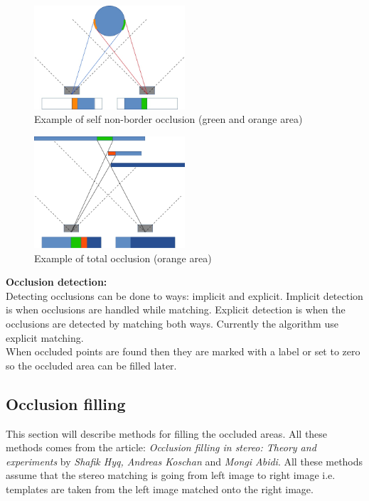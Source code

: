 \begin{figure}
  \centering
  \includegraphics[width=0.5\textwidth]{images/selfOcc}
  \caption{Example of self non-border occlusion (green and orange area)}
  \label{fig:selfOcc}
\end{figure}

\begin{figure}
  \centering
  \includegraphics[width=0.5\textwidth]{images/compOcc}
  \caption{Example of total occlusion (orange area)}
  \label{fig:totalOcc}
\end{figure}

\textbf{Occlusion detection:}\\
Detecting occlusions can be done to ways: implicit and explicit. Implicit detection is when occlusions are handled while matching. Explicit detection is when the occlusions are detected by matching both ways. Currently the algorithm use explicit matching.\\
When occluded points are found then they are marked with a label or set to zero so the occluded area can be filled later.

\subsection{Occlusion filling}
This section will describe methods for filling the occluded areas. All these methods comes from the article: \textit{Occlusion filling in stereo: Theory and experiments} by \textit{Shafik Hyq, Andreas Koschan} and \textit{Mongi Abidi}. All these methods assume that the stereo matching is going from left image to right image i.e. templates are taken from the left image matched onto the right image.
 
